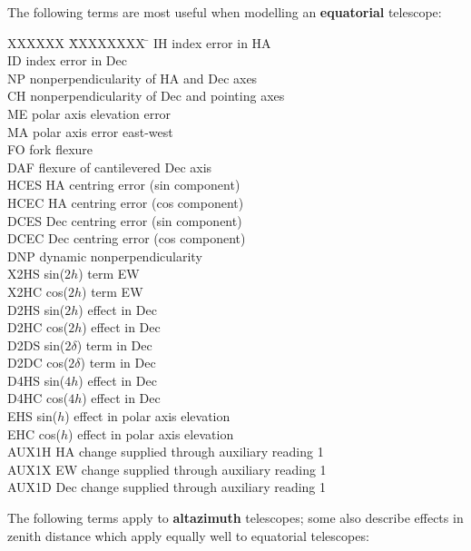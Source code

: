 The following terms are most useful when modelling an {\bf equatorial}
telescope:
\begin{tabs}
XXXXXX \= XXXXXXXX \= \kill
\> IH   \> index error in HA \\
\> ID   \> index error in Dec \\
\> NP   \> nonperpendicularity of HA and Dec axes \\
\> CH   \> nonperpendicularity of Dec and pointing axes \\
\> ME   \> polar axis elevation error \\
\> MA   \> polar axis error east-west \\
\> FO   \> fork flexure \\
\> DAF  \> flexure of cantilevered Dec axis \\
\> HCES \> HA centring error (sin component) \\
\> HCEC \> HA centring error (cos component) \\
\> DCES \> Dec centring error (sin component) \\
\> DCEC \> Dec centring error (cos component) \\
\> DNP  \> dynamic nonperpendicularity \\
\> X2HS \> sin($2h$) term EW \\
\> X2HC \> cos($2h$) term EW \\
\> D2HS \> sin($2h$) effect in Dec \\
\> D2HC \> cos($2h$) effect in Dec \\
\> D2DS \> sin($2\delta$) term in Dec \\
\> D2DC \> cos($2\delta$) term in Dec \\
\> D4HS \> sin($4h$) effect in Dec \\
\> D4HC \> cos($4h$) effect in Dec \\
\> EHS  \> sin($h$) effect in polar axis elevation \\
\> EHC  \> cos($h$) effect in polar axis elevation \\
\> AUX1H \> HA change supplied through auxiliary reading 1 \\
\> AUX1X \> EW change supplied through auxiliary reading 1 \\
\> AUX1D \> Dec change supplied through auxiliary reading 1
\end{tabs}
The following terms apply to {\bf altazimuth} telescopes;
some also describe effects
in zenith distance which apply equally well to equatorial
telescopes:
